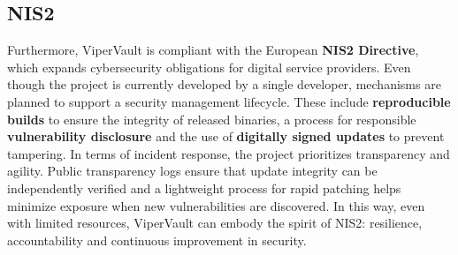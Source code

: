 	\subsection{NIS2}
		
		Furthermore, ViperVault is compliant with the European \textbf{NIS2 Directive}, which expands cybersecurity obligations for digital service providers.
		Even though the project is currently developed by a single developer, mechanisms are planned to support a security management lifecycle.
		These include \textbf{reproducible builds} to ensure the integrity of released binaries, a process for responsible \textbf{vulnerability disclosure} and the use of \textbf{digitally signed updates} to prevent tampering.
		In terms of incident response, the project prioritizes transparency and agility.
		Public transparency logs ensure that update integrity can be independently verified and a lightweight process for rapid patching helps minimize exposure when new vulnerabilities are discovered.
		In this way, even with limited resources, ViperVault can embody the spirit of NIS2: resilience, accountability and continuous improvement in security.